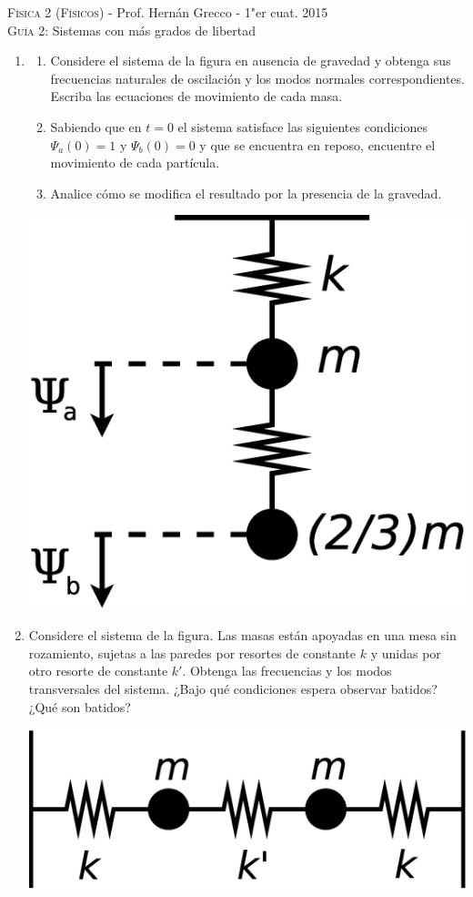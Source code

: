 \documentclass[11pt,spanish,a4paper]{article}
\begin{document}
\begin{center}
    \textsc{\large Física 2 (Físicos)} - Prof. Hernán Grecco - 1"er cuat. 2015\\
	\textsc{\large Guía 2:} Sistemas con más grados de libertad
\end{center}

\begin{enumerate}
\item
\begin{enumerate}
	\item Considere el sistema de la figura en ausencia de gravedad y obtenga sus frecuencias naturales de oscilación y los modos normales
	correspondientes.
	Escriba las ecuaciones de movimiento de cada masa.
	\item Sabiendo que en \(t=0\) el sistema satisface las siguientes condiciones \(\Psi_a(0)=1\) y \(\Psi_b(0)=0\) y que se encuentra en reposo, encuentre el movimiento de cada partícula.
	\item Analice cómo se modifica el resultado por la presencia de la gravedad.
	\end{enumerate}
 	\begin{center}
		\includegraphics[width=0.2\linewidth]{ej1-6}
 	\end{center}

\item
	Considere el sistema de la figura.
	Las masas están apoyadas en una mesa sin rozamiento, sujetas a las paredes por resortes de constante \(k\) y unidas por otro resorte de constante \(k'\).
	Obtenga las frecuencias y los modos transversales del sistema.
	¿Bajo qué condiciones espera observar batidos?
	¿Qué son batidos?

    \begin{center}
		\includegraphics[width=0.2\linewidth]{ej1-8}
    \end{center}


\end{enumerate}
\end{document}
